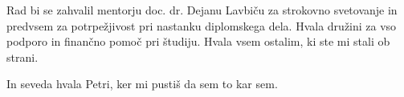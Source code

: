 








\begin{Acknowledgements}

Rad bi se zahvalil mentorju doc. dr. Dejanu Lavbiču za strokovno svetovanje in predvsem za potrpežjivost pri nastanku diplomskega dela. Hvala družini za vso podporo in finančno pomoč pri študiju. Hvala vsem ostalim, ki ste mi stali ob strani.

In seveda hvala Petri, ker mi pustiš da sem to kar sem.
\end{Acknowledgements}